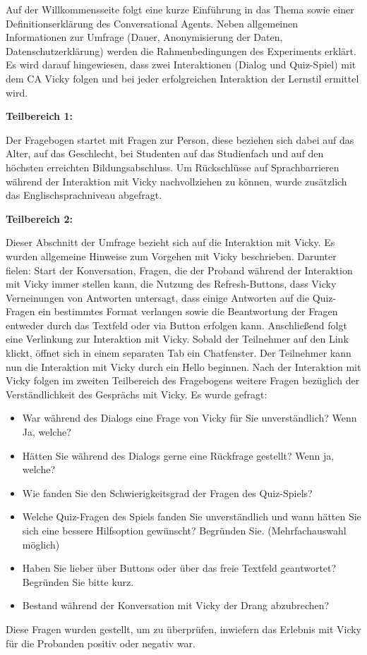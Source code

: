 Auf der Willkommensseite folgt eine kurze Einführung in das Thema sowie einer Definitionserklärung 
des Conversational Agents. Neben allgemeinen Informationen zur Umfrage (Dauer, Anonymisierung der Daten, 
Datenschutzerklärung) werden die Rahmenbedingungen des Experiments erklärt. 
Es wird darauf hingewiesen, dass zwei Interaktionen (Dialog und Quiz-Spiel) 
mit dem CA Vicky folgen und bei jeder erfolgreichen Interaktion der Lernstil ermittel wird. 

\textbf{Teilbereich 1:}

Der Fragebogen startet mit Fragen zur Person, diese beziehen sich dabei auf 
das Alter, auf das Geschlecht, bei Studenten auf das Studienfach und auf den höchsten erreichten Bildungsabschluss.
Um Rückschlüsse auf Sprachbarrieren während der Interaktion mit Vicky nachvollziehen zu können,
wurde zusätzlich das Englischsprachniveau abgefragt.

\textbf{Teilbereich 2:}

Dieser Abschnitt der Umfrage bezieht sich auf die Interaktion mit Vicky. 
Es wurden allgemeine Hinweise zum Vorgehen mit Vicky beschrieben. Darunter fielen: 
Start der Konversation,
Fragen, die der Proband während der Interaktion mit Vicky immer stellen kann,
die Nutzung des Refresh-Buttons, dass Vicky Verneinungen 
von Antworten untersagt, dass einige Antworten auf die Quiz-Fragen ein bestimmtes Format
verlangen sowie die Beantwortung der Fragen entweder durch das Textfeld oder via Button erfolgen kann. 
Anschließend folgt eine Verlinkung zur Interaktion mit Vicky. 
Sobald der Teilnehmer auf den Link klickt, öffnet sich in einem separaten Tab ein
Chatfenster. Der Teilnehmer kann nun die Interaktion mit Vicky durch ein \glqq Hello\grqq{}
beginnen. Nach der Interaktion mit Vicky folgen im zweiten Teilbereich des Fragebogens weitere Fragen 
bezüglich der Verständlichkeit des Gesprächs mit Vicky. Es wurde gefragt: 
\begin{itemize}
    \item \glqq War während des Dialogs eine Frage von Vicky für Sie unverständlich? Wenn Ja, welche?\grqq{}
    \item \glqq Hätten Sie während des Dialogs gerne eine Rückfrage gestellt? Wenn ja, welche?\grqq{}
    \item \glqq Wie fanden Sie den Schwierigkeitsgrad der Fragen des Quiz-Spiels?\grqq{}
    \item \glqq Welche Quiz-Fragen des Spiels fanden Sie unverständlich und wann hätten Sie sich eine bessere Hilfsoption gewünscht? Begründen Sie.\grqq{} (Mehrfachauswahl möglich)
    \item \glqq Haben Sie lieber über Buttons oder über das freie Textfeld geantwortet? Begründen Sie bitte kurz.\grqq{}
    \item \glqq Bestand während der Konversation mit Vicky der Drang abzubrechen?\grqq{} 
\end{itemize}
Diese Fragen wurden gestellt, um zu überprüfen, inwiefern das Erlebnis mit 
Vicky für die Probanden positiv oder negativ war. 

